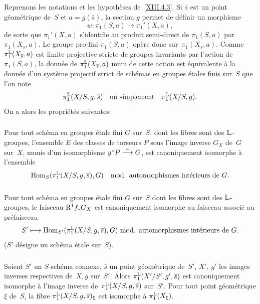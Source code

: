 \subsection{}
\label{XIII.4.5}
Reprenons les notations et les hypoth\`eses de~\ref{XIII.4.3}. Si
$\bar{s}$ est un point g\'eom\'etrique de~$S$ et $a=g(\bar{s})$,
la section $g$ permet de d\'efinir un morphisme
$$
w\colon \pi_1(S,a)\to \pi_1'(X,a),
$$
de sorte que $\pi_1'(X,a)$ s'identifie au produit semi-direct de
$\pi_1(S,a)$ par $\pi_1(X_{\bar{s}},a)$. Le groupe pro-fini
$\pi_1(S,a)$ op\`ere donc sur~$\pi_1(X_{\bar{s}}, a)$. Comme
$\pi_1^{\mathbb{L}}(X_{\overline{s}},a)$ est limite projective stricte de groupes
invariants par l'action de~$\pi_1(S,a)$, la donn\'ee de
$\pi_1^{\mathbb{L}}(X_{\overline{s}},a)$ muni de cette action est \'equivalente
\`a la donn\'ee d'un syst\`eme projectif strict de sch\'emas
en groupes \'etales finis sur~$S$ que l'on note
$$
\pi_1^{\mathbb{L}}(X/S,g,\overline{s})\quad\text{ou
simplement}\quad\pi_1^{\mathbb{L}}(X/S,g).
$$
\label{indnot:mk}
On a alors les propri\'et\'es suivantes:
\setcounter{subsubsection}{0}

\subsubsection{}
\label{XIII.4.5.1}
Pour tout sch\'ema en groupes \'etale fini $G$ sur~$S$, dont les
fibres sont des $\mathbb{L}$-groupes, l'ensemble $E$ des classes de torseurs
$P$ sous l'image inverse $G_X$ de~$G$ sur~$X$, munis d'un isomorphisme
$g^*P\overset{\sim}{\longrightarrow} G$, est canoniquement isomorphe \`a l'ensemble
$$
\operatorname{Hom}_S(\pi_1^{\mathbb{L}}(X/S,g,\overline{s}),G) \quad\text{mod. automorphismes
intérieurs de~$G$.}
$$

\subsubsection{}
\label{XIII.4.5.2}
Pour tout sch\'ema en groupes \'etale fini $G$ sur~$S$ dont les
fibres sont des $\mathbb{L}$-groupes, le faisceau $\mathrm{R}^1f_*G_X$ est
canoniquement isomorphe au faisceau associ\'e au pr\'efaisceau
$$
S'\mto \Hom_{S'}(\pi_1^\LL(X/S,g,\bar{s}),G)\
\text{mod. automorphismes intérieurs de~$G$.}
$$
($S'$ d\'esigne un sch\'ema \'etale sur~$S$).

\subsubsection{}
\label{XIII.4.5.3}
Soient
$S'$ un
$S$-sch\'ema
connexe, $\bar{s}$ un point g\'eom\'etrique de~$S'$, $X'$, $g'$
les images inverses respectives de~$X,g$ sur~$S'$. Alors
$\pi_1^{\mathbb{L}}(X'/S',g',\overline{s})$ est canoniquement isomorphe \`a
l'image inverse de~$\pi_1^{\mathbb{L}}(X/S,g,\overline{s})$ sur~$S'$. Pour tout
point g\'eom\'etrique $\xi$ de~$S$, la fibre
$\pi_1^{\mathbb{L}}(X/S,g,\overline{s})_\xi$ est isomorphe \`a $\pi_1^{\mathbb{L}}(X_\xi)$.

